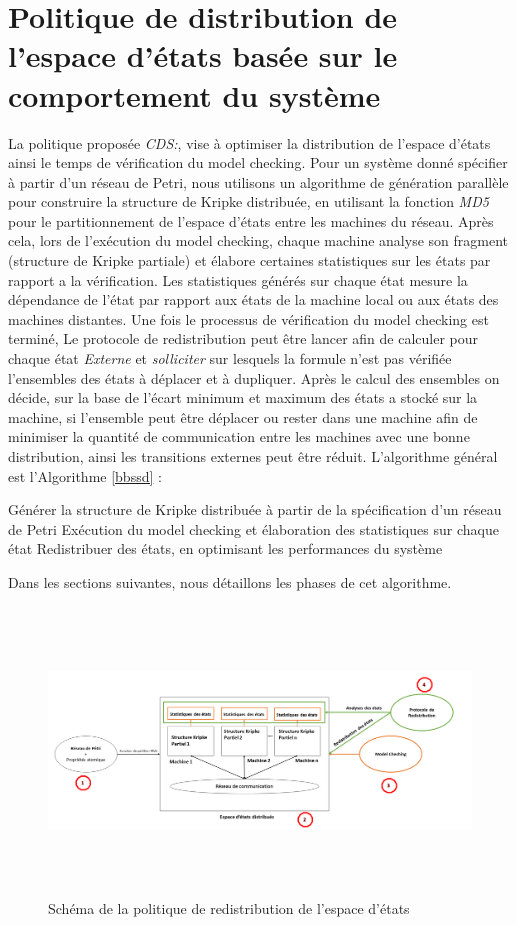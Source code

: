 
\section{Politique de distribution de l’espace d’états basée sur le	comportement du système}
 
La politique proposée \emph{CDS{}:\CDSDef{}}, vise à optimiser la distribution de l’espace d’états ainsi le temps de vérification du model checking. Pour un système donné spécifier à partir d'un réseau de Petri, nous utilisons un algorithme de génération parallèle pour construire la structure de Kripke distribuée, en utilisant la fonction \emph{MD5} pour le partitionnement de l’espace d’états entre les machines du réseau. Après cela, lors de l'exécution du model checking, chaque machine analyse son fragment (structure de Kripke partiale) et élabore certaines statistiques sur les états par rapport a la vérification. Les statistiques  générés sur chaque état mesure la dépendance de l'état par rapport aux états de la machine local ou aux états des machines distantes. Une fois le processus de vérification du model checking est terminé, Le protocole de redistribution peut être lancer afin de calculer pour chaque état \emph{Externe} et \emph{solliciter} sur lesquels la formule n'est pas vérifiée l'ensembles des états à déplacer et à dupliquer. Après le calcul des ensembles on décide, sur la base de l'écart minimum et maximum des états a stocké sur la machine, si l'ensemble peut être déplacer ou rester dans une machine afin de minimiser la quantité de communication entre les machines avec une bonne distribution, ainsi les transitions externes peut être réduit.
L’algorithme général est l'Algorithme \ref{bbssd} :\\
\begin{algorithm}[H]\label{bbssd}
	\SetAlgoLined
	 Générer la structure de Kripke distribuée à partir de la spécification d'un réseau de Petri\;
	 Exécution du model checking et élaboration des statistiques sur chaque état\;
	 Redistribuer des états, en optimisant les performances du système\;	  
	\caption{\CDS{}}
\end{algorithm}
Dans les sections suivantes, nous détaillons les phases de cet algorithme.

 
\begin{figure}[h]
	\centering
	\includegraphics[height=3.0in,width=1.0\textwidth]{img/protocole}
	\caption{Schéma de la politique de redistribution de l'espace d’états}
\end{figure}
	
